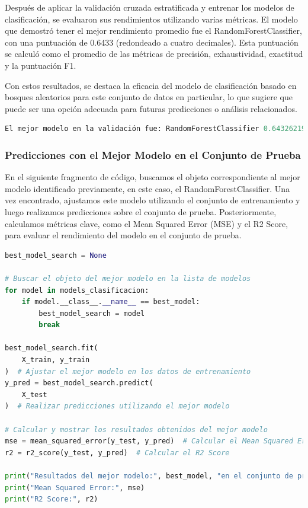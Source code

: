 Después de aplicar la validación cruzada estratificada y entrenar los modelos de clasificación, se evaluaron sus rendimientos utilizando varias métricas. El modelo que demostró tener el mejor rendimiento promedio fue el RandomForestClassifier, con una puntuación de 0.6433 (redondeado a cuatro decimales). Esta puntuación se calculó como el promedio de las métricas de precisión, exhaustividad, exactitud y la puntuación F1.

Con estos resultados, se destaca la eficacia del modelo de clasificación basado en bosques aleatorios para este conjunto de datos en particular, lo que sugiere que puede ser una opción adecuada para futuras predicciones o análisis relacionados.

\begin{lstlisting}[language=Python, caption=Resultado Mejor modelo en la Validacion de Clasificación, label=lst:rest_bestModelClasification]
El mejor modelo en la validación fue: RandomForestClassifier 0.6432621955500205
    \end{lstlisting}




\subsubsection{Predicciones con el Mejor Modelo en el Conjunto de Prueba}

En el siguiente fragmento de código, buscamos el objeto correspondiente al mejor modelo identificado previamente, en este caso, el RandomForestClassifier. Una vez encontrado, ajustamos este modelo utilizando el conjunto de entrenamiento y luego realizamos predicciones sobre el conjunto de prueba. Posteriormente, calculamos métricas clave, como el Mean Squared Error (MSE) y el R2 Score, para evaluar el rendimiento del modelo en el conjunto de prueba.

\begin{lstlisting}[language=Python, caption=Predicciones y evaluación del mejor modelo, label=lst:prediccion_mejor_modelo]
best_model_search = None

# Buscar el objeto del mejor modelo en la lista de modelos
for model in models_clasificacion:
    if model.__class__.__name__ == best_model:
        best_model_search = model
        break

best_model_search.fit(
    X_train, y_train
)  # Ajustar el mejor modelo en los datos de entrenamiento
y_pred = best_model_search.predict(
    X_test
)  # Realizar predicciones utilizando el mejor modelo

# Calcular y mostrar los resultados obtenidos del mejor modelo
mse = mean_squared_error(y_test, y_pred)  # Calcular el Mean Squared Error
r2 = r2_score(y_test, y_pred)  # Calcular el R2 Score

print("Resultados del mejor modelo:", best_model, "en el conjunto de prueba:")
print("Mean Squared Error:", mse)
print("R2 Score:", r2)
    \end{lstlisting}


